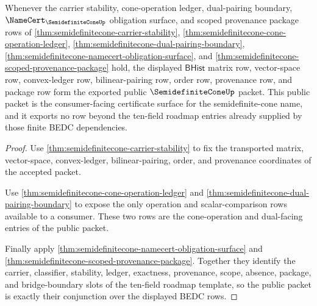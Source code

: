 \begin{theorem}
\label{thm:semidefinitecone-public-packet-certificate}
Whenever the carrier stability, cone-operation ledger, dual-pairing boundary,
$\NameCert_{\SemidefiniteConeUp}$ obligation surface, and scoped provenance
package rows of
\autoref{thm:semidefinitecone-carrier-stability},
\autoref{thm:semidefinitecone-cone-operation-ledger},
\autoref{thm:semidefinitecone-dual-pairing-boundary},
\autoref{thm:semidefinitecone-namecert-obligation-surface}, and
\autoref{thm:semidefinitecone-scoped-provenance-package} hold, the displayed
$\mathsf{BHist}$ matrix row, vector-space row, convex-ledger row,
bilinear-pairing row, order row, provenance row, and package row form the
exported public $\SemidefiniteConeUp$ packet. This public packet is the
consumer-facing certificate surface for the semidefinite-cone name, and it
exports no row beyond the ten-field roadmap entries already supplied by those
finite BEDC dependencies.
\end{theorem}
\begin{proof}
Use \autoref{thm:semidefinitecone-carrier-stability} to fix the transported
matrix, vector-space, convex-ledger, bilinear-pairing, order, and provenance
coordinates of the accepted packet.

Use \autoref{thm:semidefinitecone-cone-operation-ledger} and
\autoref{thm:semidefinitecone-dual-pairing-boundary} to expose the only
operation and scalar-comparison rows available to a consumer. These two rows
are the cone-operation and dual-facing entries of the public packet.

Finally apply \autoref{thm:semidefinitecone-namecert-obligation-surface} and
\autoref{thm:semidefinitecone-scoped-provenance-package}. Together they identify
the carrier, classifier, stability, ledger, exactness, provenance, scope,
absence, package, and bridge-boundary slots of the ten-field roadmap template,
so the public packet is exactly their conjunction over the displayed BEDC rows.
\end{proof}

